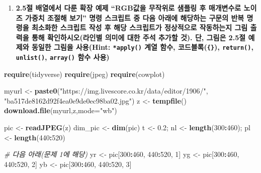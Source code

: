 \documentclass[
  11pt,
]{krantz}
\newenvironment{Shaded}{\begin{snugshade}}{\end{snugshade}}
\newcommand{\CommentTok}[1]{\textcolor[rgb]{0.37,0.37,0.37}{\textit{#1}}}
\newcommand{\DataTypeTok}[1]{\textcolor[rgb]{0.27,0.27,0.27}{#1}}
\newcommand{\DecValTok}[1]{\textcolor[rgb]{0.06,0.06,0.06}{#1}}
\newcommand{\FloatTok}[1]{\textcolor[rgb]{0.06,0.06,0.06}{#1}}
\newcommand{\KeywordTok}[1]{\textcolor[rgb]{0.27,0.27,0.27}{\textbf{#1}}}
\newcommand{\NormalTok}[1]{#1}
\newcommand{\OperatorTok}[1]{\textcolor[rgb]{0.43,0.43,0.43}{\textbf{#1}}}
\newcommand{\StringTok}[1]{\textcolor[rgb]{0.5,0.5,0.5}{#1}}
\providecommand{\tightlist}{%
  \setlength{\itemsep}{0pt}\setlength{\parskip}{0pt}}
\begin{document}
\begin{enumerate}
\def\labelenumi{\arabic{enumi}.}
\tightlist
\item
  \textbf{2.5절 배열에서 다룬 확장 예제 ``RGB값을 무작위로 샘플링 후 매개변수로 노이즈 가중치 조절해 보기'' 명령 스크립트 중 다음 아래에 해당하는 구문의 반복 명령을 최소화한 스크립트 작성 후 해당 스크립트가 정상적으로 작동하는지 그림 출력을 통해 확인하시오(라인별 의미에 대한 주석 추가할 것). 단, 그림은 2.5절 예제와 동일한 그림을 사용(Hint: \texttt{*apply()} 계열 함수, 코드블록(\texttt{\{\}}), \texttt{return()}, \texttt{unlist()}, \texttt{array()} 함수 사용)}
\end{enumerate}

\footnotesize

\begin{Shaded}
\begin{Highlighting}[]
\KeywordTok{require}\NormalTok{(tidyverse)}
\KeywordTok{require}\NormalTok{(jpeg)}
\KeywordTok{require}\NormalTok{(cowplot)}

\NormalTok{myurl <-}\StringTok{ }\KeywordTok{paste0}\NormalTok{(}\StringTok{"https://img.livescore.co.kr/data/editor/1906/"}\NormalTok{, }
                \StringTok{"ba517de8162d92f4ea0e9de0ec98ba02.jpg"}\NormalTok{)}
\NormalTok{z <-}\StringTok{ }\KeywordTok{tempfile}\NormalTok{()}
\KeywordTok{download.file}\NormalTok{(myurl,z,}\DataTypeTok{mode=}\StringTok{"wb"}\NormalTok{)}

\NormalTok{pic <-}\StringTok{ }\KeywordTok{readJPEG}\NormalTok{(z)}
\NormalTok{dim_pic <-}\StringTok{ }\KeywordTok{dim}\NormalTok{(pic)}
\NormalTok{t <-}\StringTok{ }\FloatTok{0.2}\NormalTok{; nl <-}\StringTok{ }\KeywordTok{length}\NormalTok{(}\DecValTok{300}\OperatorTok{:}\DecValTok{460}\NormalTok{); pl <-}\StringTok{ }\KeywordTok{length}\NormalTok{(}\DecValTok{440}\OperatorTok{:}\DecValTok{520}\NormalTok{)}

\CommentTok{# 다음 아래(문제 1에 해당)}
\NormalTok{yr <-}\StringTok{ }\NormalTok{pic[}\DecValTok{300}\OperatorTok{:}\DecValTok{460}\NormalTok{, }\DecValTok{440}\OperatorTok{:}\DecValTok{520}\NormalTok{, }\DecValTok{1}\NormalTok{]}
\NormalTok{yg <-}\StringTok{ }\NormalTok{pic[}\DecValTok{300}\OperatorTok{:}\DecValTok{460}\NormalTok{, }\DecValTok{440}\OperatorTok{:}\DecValTok{520}\NormalTok{, }\DecValTok{2}\NormalTok{]}
\NormalTok{yb <-}\StringTok{ }\NormalTok{pic[}\DecValTok{300}\OperatorTok{:}\DecValTok{460}\NormalTok{, }\DecValTok{440}\OperatorTok{:}\DecValTok{520}\NormalTok{, }\DecValTok{3}\NormalTok{]}


\end{Highlighting}
\end{Shaded}
\end{document}
